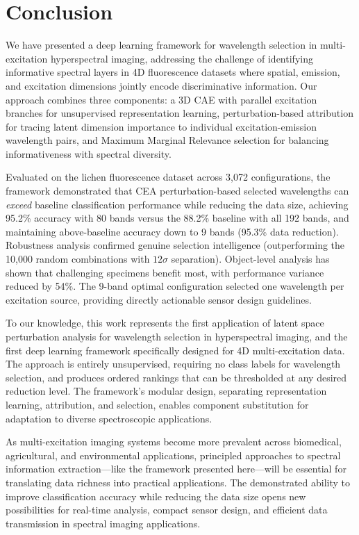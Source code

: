 \section{Conclusion}
\label{sec:conclusion}

We have presented a deep learning framework for wavelength selection in multi-excitation hyperspectral imaging, addressing the challenge of identifying informative spectral layers in 4D fluorescence datasets where spatial, emission, and excitation dimensions jointly encode discriminative information.
Our approach combines three components: a 3D CAE with parallel excitation branches for unsupervised representation learning, perturbation-based attribution for tracing latent dimension importance to individual excitation-emission wavelength pairs, and Maximum Marginal Relevance selection for balancing informativeness with spectral diversity.

Evaluated on the lichen fluorescence dataset across 3,072 configurations, the framework demonstrated that CEA perturbation-based selected wavelengths can \emph{exceed} baseline classification performance while reducing the data size, achieving 95.2\% accuracy with 80 bands versus the 88.2\% baseline with all 192 bands, and maintaining above-baseline accuracy down to 9 bands (95.3\% data reduction).
Robustness analysis confirmed genuine selection intelligence (outperforming the 10,000 random combinations with $12\sigma$ separation). Object-level analysis has shown that challenging specimens benefit most, with performance variance reduced by 54\%.
The 9-band optimal configuration selected one wavelength per excitation source, providing directly actionable sensor design guidelines.

To our knowledge, this work represents the first application of latent space perturbation analysis for wavelength selection in hyperspectral imaging, and the first deep learning framework specifically designed for 4D multi-excitation data.
The approach is entirely unsupervised, requiring no class labels for wavelength selection, and produces ordered rankings that can be thresholded at any desired reduction level.
The framework's modular design, separating representation learning, attribution, and selection, enables component substitution for adaptation to diverse spectroscopic applications.

As multi-excitation imaging systems become more prevalent across biomedical, agricultural, and environmental applications, principled approaches to spectral information extraction---like the framework presented here---will be essential for translating data richness into practical applications.
The demonstrated ability to improve classification accuracy while reducing the data size opens new possibilities for real-time analysis, compact sensor design, and efficient data transmission in spectral imaging applications.